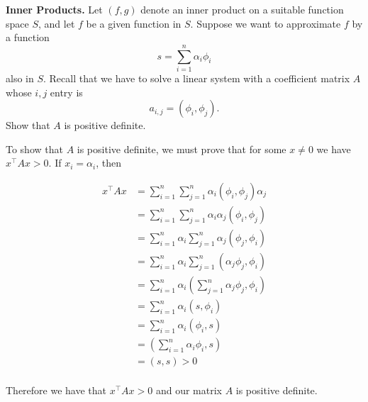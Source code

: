 \textbf{Inner Products.} Let $(f, g)$ denote an inner product on a
suitable function space $S$, and let $f$ be a given function in $S$.
Suppose we want to approximate $f$ by a function \[s = \sum_{i=1}^n
\alpha_i \phi_i\] also in $S$. Recall that we have to solve a linear
system with a coefficient matrix $A$ whose $i,j$ entry is \[a_{i,j} =
(\phi_i, \phi_j).\] Show that $A$ is positive definite.

{\color{blue}

To show that $A$ is positive definite, we must prove that for some
$x \ne 0$ we have $x^\intercal A x > 0$. If $x_i = \alpha_i$, then

\begin{align*}
x^\intercal A x &= \sum_{i=1}^n \sum_{j=1}^n \alpha_i (\phi_i, \phi_j) \alpha_j \\
              &= \sum_{i=1}^n \sum_{j=1}^n \alpha_i \alpha_j (\phi_i, \phi_j) \\
              &= \sum_{i=1}^n \alpha_i \sum_{j=1}^n \alpha_j (\phi_j, \phi_i) \\
              &= \sum_{i=1}^n \alpha_i \sum_{j=1}^n (\alpha_j \phi_j, \phi_i) \\
              &= \sum_{i=1}^n \alpha_i (\sum_{j=1}^n \alpha_j \phi_j, \phi_i) \\
              &= \sum_{i=1}^n \alpha_i (s, \phi_i) \\
              &= \sum_{i=1}^n \alpha_i (\phi_i, s) \\
              &= (\sum_{i=1}^n \alpha_i \phi_i, s) \\
              &= (s, s) > 0 \\
\end{align*}

Therefore we have that $x^\intercal A x > 0$ and our matrix $A$ is
positive definite.

}
